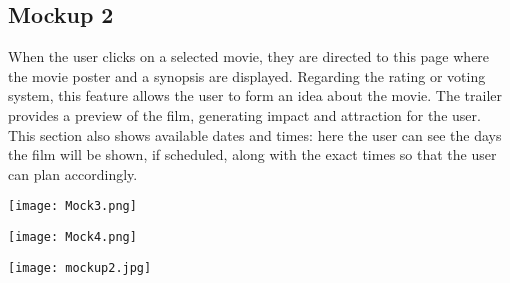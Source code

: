\documentclass[12pt, letterpaper]{article}
\begin{document}
\begin{center}
\begin{minipage}[t]{0.6\textwidth}
    \subsection*{Mockup 2}
    When the user clicks on a selected movie, they are directed to this page where the movie poster and a synopsis are displayed.
    Regarding the rating or voting system, this feature allows the user to form an idea about the movie.
    The trailer provides a preview of the film, generating impact and attraction for the user.
    This section also shows available dates and times: here the user can see the days the film will be shown, if scheduled, along with the exact times so that the user can plan accordingly.


    \begin{center}
        \texttt{[image: Mock3.png]}
    \end{center}

    \vspace{1em}
    
    
    
    \begin{center}
        \texttt{[image: Mock4.png]}
    \end{center}
\end{minipage}
\hfill
\begin{minipage}[t]{0.37\textwidth}    
    \vspace{1em}
    \begin{center}
        \texttt{[image: mockup2.jpg]}
    \end{center}
\end{minipage}
\end{center}
\end{document}
